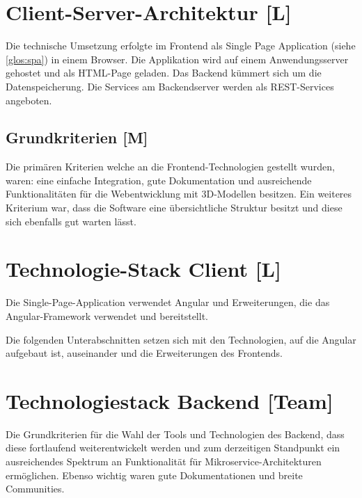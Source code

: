 \section{Client-Server-Architektur [L]}
Die technische Umsetzung erfolgte im Frontend als Single Page Application (siehe \ref{glos:spa}) in einem Browser. Die Applikation wird auf einem Anwendungsserver gehostet und als HTML-Page geladen. Das Backend kümmert sich um die Datenspeicherung. Die Services am Backendserver werden als REST-Services angeboten.

\subsection{Grundkriterien [M]} 
Die primären Kriterien welche an die Frontend-Technologien gestellt wurden, waren: eine einfache Integration, gute Dokumentation und ausreichende Funktionalitäten für die Webentwicklung mit 3D-Modellen besitzen. Ein weiteres Kriterium war, dass die Software eine übersichtliche Struktur besitzt und diese sich ebenfalls gut warten lässt. 

  

\section{Technologie-Stack Client [L]}
Die Single-Page-Application verwendet Angular und Erweiterungen, die das Angular-Framework verwendet und bereitstellt.

Die folgenden Unterabschnitten setzen sich mit den Technologien, auf die Angular aufgebaut ist, auseinander und die Erweiterungen des Frontends.




\newpage
\section{Technologiestack Backend [Team]}
Die Grundkriterien für die Wahl der Tools und Technologien des Backend, dass diese fortlaufend weiterentwickelt werden und zum derzeitigen Standpunkt ein ausreichendes Spektrum an Funktionalität für Mikroservice-Architekturen ermöglichen.\cite{MicroserviceAbout} Ebenso wichtig waren gute Dokumentationen und breite Communities.



